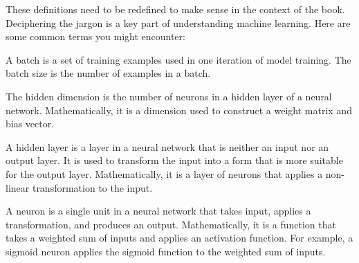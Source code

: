 %
%


These definitions need to be redefined to make sense in the context of the book. Deciphering the jargon is a key part of understanding machine learning. Here are some common terms you might encounter:

 A batch is a set of training examples used in one iteration of model training. The batch size is the number of examples in a batch.

 The hidden dimension is the number of neurons in a hidden layer of a neural network. Mathematically, it is a dimension used to construct a weight matrix and bias vector.

 A hidden layer is a layer in a neural network that is neither an input nor an output layer. It is used to transform the input into a form that is more suitable for the output layer. Mathematically, it is a layer of neurons that applies a non-linear transformation to the input.

 A neuron is a single unit in a neural network that takes input, applies a transformation, and produces an output. Mathematically, it is a function that takes a weighted sum of inputs and applies an activation function. For example, a sigmoid neuron applies the sigmoid function to the weighted sum of inputs.